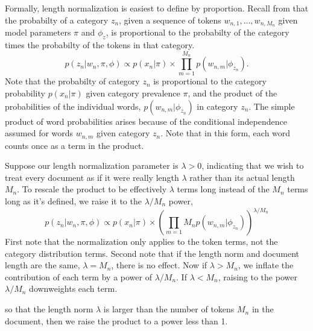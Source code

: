 Formally, length normalization is easiest to define by proportion.
Recall from  that the probabilty of a category
$z_n$, given a sequence of tokens $w_{n,1},\ldots,w_{n,M_n}$ given
model parameters $\pi$ and $\phi_z$, is proportional to the probabilty
of the category times the probabilty of the tokens in that category.
%
\begin{equation}
p(z_n|w_n,\pi,\phi) \propto p(x_n|\pi) \times \prod_{m=1}^{M_n} p(w_{n,m}|\phi_{z_n}).
\end{equation}
%
Note that the probabilty of category $z_n$ is proportional to the
category probability $p(x_n|\pi)$ given category prevalence $\pi$, and
the product of the probabilities of the individual words,
$p(w_{n,m}|\phi_{z_n})$ in category $z_n$.  The simple product of word
probabilities arises because of the conditional independence assumed
for words $w_{n,m}$ given category $z_n$.  Note that in this form,
each word counts once as a term in the product.  

Suppose our length normalization parameter is $\lambda > 0$,
indicating that we wish to treat every document as if it were really
length $\lambda$ rather than its actual length $M_n$.  To rescale
the product to be effectively $\lambda$ terms long instead of the
$M_n$ terms long as it's defined, we raise it to the $\lambda/M_n$
power,
%
\begin{equation}
p(z_n|w_n,\pi,\phi) \propto p(x_n|\pi) \times \left( \prod_{m=1}{M_n} p(w_{n,m}|\phi_{z_n}) \right)^{\textstyle \lambda / M_n}
\end{equation}
%
First note that the normalization only applies to the token terms, not
the category distribution terms.  Second note that if the length norm
and document length are the same, $\lambda = M_n$, there is no effect.
Now if $\lambda > M_n$, we inflate the contribution of each term
by a power of $\lambda/M_n$.  If $\lambda < M_n$, raising to the
power $\lambda/M_n$ downweights each term.

so that the length norm $\lambda$ is larger than the number of tokens
$M_n$ in the document, then we raise the product to a power less than
1.













